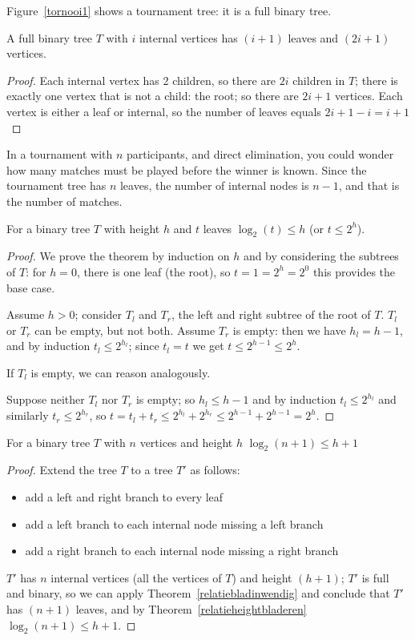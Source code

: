 Figure~\ref{tornooi1} shows a tournament tree: it is a full binary tree.

 \begin{theorem}
\label{relatiebladinwendig}
A full binary tree $T$ with $i$ internal vertices has
$(i+1)$ leaves and $(2i+1)$ vertices.
\end{theorem}
\begin{proof} Each internal vertex has 2 children, so there are $2i$
children in $T$; there is exactly one vertex that is not a child: the
root; so there are $2i+1$ vertices. Each vertex is either a leaf or
internal, so the number of leaves equals $2i+1 - i = i+1$
\end{proof}


In a tournament with $n$ participants, and direct elimination, you
could wonder how many matches must be played before the winner is
known. Since the tournament tree has $n$ leaves, the number of
internal nodes is $n-1$, and that is the number of matches.

 \begin{theorem}
\label{relatieheightbladeren}
For a binary tree $T$ with height $h$ and $t$ leaves $\log_2(t) \leq
h$ (or $t \leq 2^h$).
\end{theorem}
\begin{proof}
We prove the theorem by induction on $h$ and by considering the
subtrees of $T$: for $h=0$, there is one leaf (the root), so
$t=1=2^h=2^0$ this provides the base case.

Assume $h > 0$; consider $T_{l}$ and $T_{r}$, the left and right
subtree of the root of $T$. $T_{l}$ or $T_{r}$ can be empty, but not both.
Assume $T_{r}$ is empty: then we have $h_{l} = h-1$, and by induction
$t_{l} \leq 2^{h_{l}}$; since $t_{l} = t$ we get $t \leq 2^{h-1}\leq
2^h$.

If $T_{l}$ is empty, we can reason analogously.

Suppose neither $T_{l}$ nor $T_{r}$ is empty; so $h_{l} \leq h-1$ and
by induction $t_{l} \leq 2^{h_{l}}$ and similarly $t_{r} \leq
2^{h_{r}}$, so $t=t_{l} + t_{r} \leq 2^{h_{l}} + 2^{h_{r}}\leq
2^{h-1}+2^{h-1}=2^h$.
\end{proof}

 \begin{theorem} For a binary tree $T$ with $n$ vertices and
height $h$ $\log_2(n+1) \leq h+1$
\label{relatieheightnodes}
\end{theorem}
\begin{proof}
Extend the tree $T$ to a tree $T'$ as follows:
\begin{itemize}
\item
add a left and right branch to every leaf
\item
add a left branch to each internal node missing a left branch
\item
add a right branch to each internal node missing a right branch
\end{itemize}

$T'$ has $n$ internal vertices (all the vertices of $T$) and height
$(h+1)$; $T'$ is full and binary, so we can apply
Theorem~\ref{relatiebladinwendig} and conclude that $T'$ has
$(n+1)$ leaves, and by Theorem~\ref{relatieheightbladeren} $\log_2(n+1)
\leq h+1$.
\end{proof}

